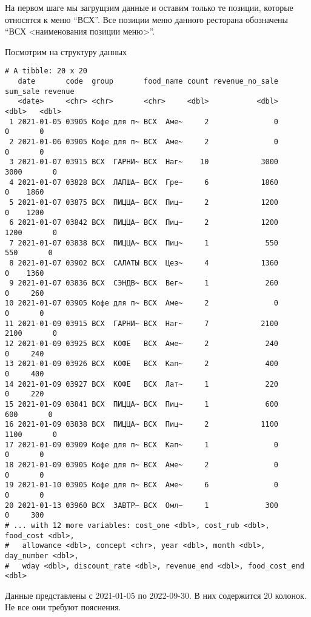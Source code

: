 \documentclass[
  letterpaper,
  DIV=11,
  numbers=noendperiod]{scrreport}
\begin{document}
На первом шаге мы загрущзим данные и оставим только те позиции, которые
относятся к меню ``ВСХ''. Все позиции меню данного ресторана обозначены
``ВСХ \textless наименования позиции меню\textgreater{}''.

Посмотрим на структуру данных

\begin{verbatim}
# A tibble: 20 x 20
   date       code  group       food_name count revenue_no_sale sum_sale revenue
   <date>     <chr> <chr>       <chr>     <dbl>           <dbl>    <dbl>   <dbl>
 1 2021-01-05 03905 Кофе для п~ ВСХ  Аме~     2               0        0       0
 2 2021-01-06 03905 Кофе для п~ ВСХ  Аме~     2               0        0       0
 3 2021-01-07 03915 ВСХ  ГАРНИ~ ВСХ  Наг~    10            3000     3000       0
 4 2021-01-07 03828 ВСХ  ЛАПША~ ВСХ  Гре~     6            1860        0    1860
 5 2021-01-07 03875 ВСХ  ПИЦЦА~ ВСХ  Пиц~     2            1200        0    1200
 6 2021-01-07 03842 ВСХ  ПИЦЦА~ ВСХ  Пиц~     2            1200     1200       0
 7 2021-01-07 03838 ВСХ  ПИЦЦА~ ВСХ  Пиц~     1             550      550       0
 8 2021-01-07 03902 ВСХ  САЛАТЫ ВСХ  Цез~     4            1360        0    1360
 9 2021-01-07 03836 ВСХ  СЭНДВ~ ВСХ  Вег~     1             260        0     260
10 2021-01-07 03905 Кофе для п~ ВСХ  Аме~     2               0        0       0
11 2021-01-09 03915 ВСХ  ГАРНИ~ ВСХ  Наг~     7            2100     2100       0
12 2021-01-09 03925 ВСХ  КОФЕ   ВСХ  Аме~     2             240        0     240
13 2021-01-09 03926 ВСХ  КОФЕ   ВСХ  Кап~     2             400        0     400
14 2021-01-09 03927 ВСХ  КОФЕ   ВСХ  Лат~     1             220        0     220
15 2021-01-09 03841 ВСХ  ПИЦЦА~ ВСХ  Пиц~     1             600      600       0
16 2021-01-09 03838 ВСХ  ПИЦЦА~ ВСХ  Пиц~     2            1100     1100       0
17 2021-01-09 03909 Кофе для п~ ВСХ  Кап~     1               0        0       0
18 2021-01-09 03905 Кофе для п~ ВСХ  Аме~     2               0        0       0
19 2021-01-10 03905 Кофе для п~ ВСХ  Аме~     6               0        0       0
20 2021-01-13 03960 ВСХ  ЗАВТР~ ВСХ  Омл~     1             300        0     300
# ... with 12 more variables: cost_one <dbl>, cost_rub <dbl>, food_cost <dbl>,
#   allowance <dbl>, concept <chr>, year <dbl>, month <dbl>, day_number <dbl>,
#   wday <dbl>, discount_rate <dbl>, revenue_end <dbl>, food_cost_end <dbl>
\end{verbatim}

Данные представлены с 2021-01-05 по 2022-09-30. В них содержится 20
колонок. Не все они требуют пояснения.
\end{document}
